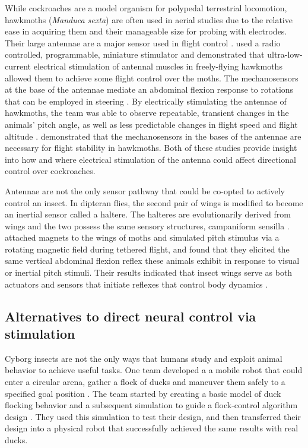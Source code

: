 While cockroaches are a model organism for polypedal terrestrial locomotion, hawkmoths (\emph{Manduca sexta}) are often used in aerial studies due to the relative ease in acquiring them and their manageable size for probing with electrodes.  Their large antennae are a major sensor used in flight control \citep{antennal}.  \citet{wireless} used a radio controlled, programmable, miniature stimulator and demonstrated that ultra-low-current electrical stimulation of antennal muscles in freely-flying hawkmoths allowed them to achieve some flight control over the moths. The mechanosensors at the base of the antennae mediate an abdominal flexion response to rotations that can be employed in steering \citep{wireless}. By electrically stimulating the antennae of hawkmoths, the team was able to observe repeatable, transient changes in the animals’ pitch angle, as well as less predictable changes in flight speed and flight altitude \citep{wireless}. \citet{antennal} demonstrated that the mechanosensors in the bases of the antennae are necessary for flight stability in hawkmoths. Both of these studies provide insight into how and where electrical stimulation of the antenna could affect directional control over cockroaches.

Antennae are not the only sensor pathway that could be co-opted to actively control an insect. In dipteran flies, the second pair of wings is modified to become an inertial sensor called a haltere.  The halteres are evolutionarily derived from wings and the two possess the same sensory structures, campaniform sensilla \citep{Dickerson2014}. \citet{Dickerson2014} attached magnets to the wings of moths and simulated pitch stimulus via a rotating magnetic field during tethered flight, and found that they elicited the same vertical abdominal flexion reflex these animals exhibit in response to visual or inertial pitch stimuli. Their results indicated that insect wings serve as both actuators and sensors that initiate reflexes that control body dynamics \citep{Dickerson2014}.

\subsection{Alternatives to direct neural control via stimulation}
Cyborg insects are not the only ways that humans study and exploit animal behavior to achieve useful tasks. One team developed a a mobile robot that could enter a circular arena, gather a flock of ducks and maneuver them safely to a specified goal position \citep{robot}. The team started by creating a basic model of duck flocking behavior and a subsequent simulation to guide a flock-control algorithm design \citep{robot}. They used this simulation to test their design, and then transferred their design into a physical robot that successfully achieved the same results with real ducks\citep{robot}.

